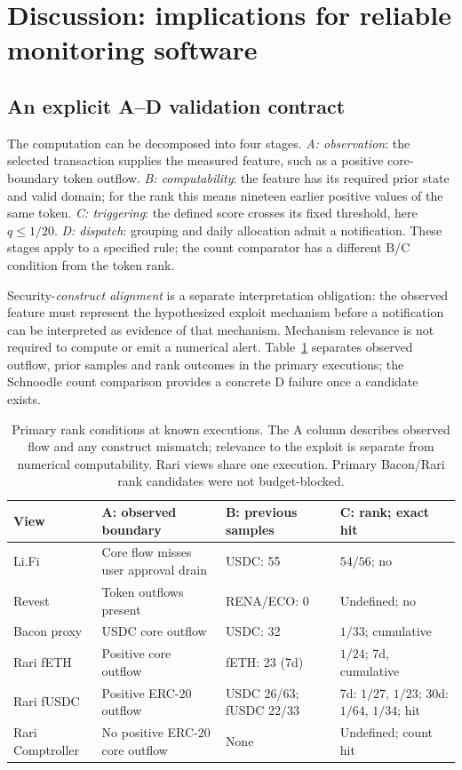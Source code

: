 \documentclass[preprint,12pt,authoryear]{elsarticle}
\begin{document}
\section{Discussion: implications for reliable monitoring software}\label{sec:discussion}
\subsection{An explicit A--D validation contract}
The computation can be decomposed into four stages. \emph{A: observation}: the selected transaction supplies the measured feature, such as a positive core-boundary token outflow. \emph{B: computability}: the feature has its required prior state and valid domain; for the rank this means nineteen earlier positive values of the same token. \emph{C: triggering}: the defined score crosses its fixed threshold, here $q\leq1/20$. \emph{D: dispatch}: grouping and daily allocation admit a notification. These stages apply to a specified rule; the count comparator has a different B/C condition from the token rank.

Security-\emph{construct alignment} is a separate interpretation obligation: the observed feature must represent the hypothesized exploit mechanism before a notification can be interpreted as evidence of that mechanism. Mechanism relevance is not required to compute or emit a numerical alert. Table~\ref{tab:abc} separates observed outflow, prior samples and rank outcomes in the primary executions; the Schnoodle count comparison provides a concrete D failure once a candidate exists.

\begin{table}[htbp]
\centering\footnotesize
\caption{Primary rank conditions at known executions. The A column describes observed flow and any construct mismatch; relevance to the exploit is separate from numerical computability. Rari views share one execution. Primary Bacon/Rari rank candidates were not budget-blocked.}
\label{tab:abc}
\setlength{\tabcolsep}{3pt}
\begin{tabularx}{\linewidth}{p{2.0cm} >{\raggedright\arraybackslash}X >{\raggedright\arraybackslash}p{2.0cm} >{\raggedright\arraybackslash}X}
\toprule
View & A: observed boundary & B: previous samples & C: rank; exact hit \\
\midrule
Li.Fi & Core flow misses user approval drain & USDC: 55 & $54/56$; no \\
Revest & Token outflows present & RENA/ECO: 0 & Undefined; no \\
Bacon proxy & USDC core outflow & USDC: 32 & $1/33$; cumulative \\
Rari fETH & Positive core outflow & fETH: 23 (7d) & $1/24$; 7d, cumulative \\
Rari fUSDC & Positive ERC-20 outflow & USDC 26/63; fUSDC 22/33 & 7d: $1/27$, $1/23$; 30d: $1/64$, $1/34$; hit \\
Rari Comptroller & No positive ERC-20 core outflow & None & Undefined; count hit \\
\bottomrule
\end{tabularx}
\end{table}
\end{document}
